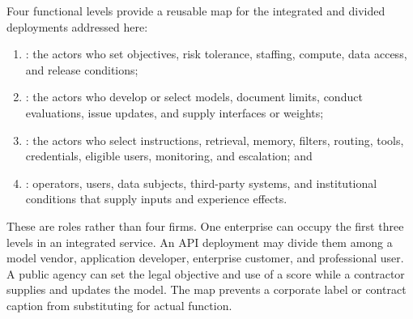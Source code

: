 Four functional levels provide a reusable map for the integrated and divided deployments addressed here:

\begin{enumerate}[leftmargin=2.2em]
\item {}: the actors who set objectives, risk tolerance, staffing, compute, data access, and release conditions;
\item {}: the actors who develop or select models, document limits, conduct evaluations, issue updates, and supply interfaces or weights;
\item {}: the actors who select instructions, retrieval, memory, filters, routing, tools, credentials, eligible users, monitoring, and escalation; and
\item {}: operators, users, data subjects, third-party systems, and institutional conditions that supply inputs and experience effects.
\end{enumerate}

These are roles rather than four firms. One enterprise can occupy the first three levels in an integrated service. An API deployment may divide them among a model vendor, application developer, enterprise customer, and professional user. A public agency can set the legal objective and use of a score while a contractor supplies and updates the model. The map prevents a corporate label or contract caption from substituting for actual function.

